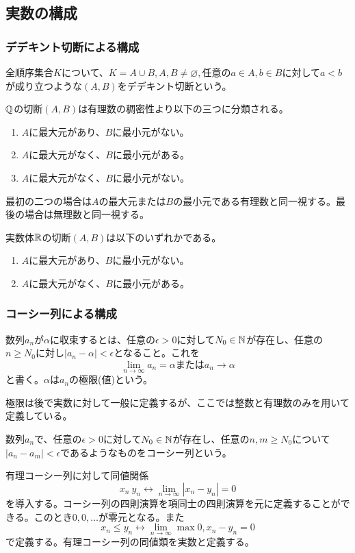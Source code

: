 \subsection{実数の構成}
	\subsubsection{デデキント切断による構成}
		\begin{dfn}[デデキント切断]
			全順序集合$K$について、$K = A \cup B, A, B \neq \varnothing, $任意の$a \in A, b \in B$に対して$a < b$が成り立つような$(A, B)$をデデキント切断という。
		\end{dfn}
		$\mathbb{Q}$の切断$(A, B)$は有理数の稠密性より以下の三つに分類される。
		\begin{enumerate}
			\item $A$に最大元があり、$B$に最小元がない。
			\item $A$に最大元がなく、$B$に最小元がある。
			\item $A$に最大元がなく、$B$に最小元がない。
		\end{enumerate}
		最初の二つの場合は$A$の最大元または$B$の最小元である有理数と同一視する。最後の場合は無理数と同一視する。
		\begin{axm}[デデキントの公理]
			実数体$\mathbb{R}$の切断$(A, B)$は以下のいずれかである。
			\begin{enumerate}
				\item $A$に最大元があり、$B$に最小元がない。
				\item $A$に最大元がなく、$B$に最小元がある。
			\end{enumerate}
		\end{axm}

	\subsubsection{コーシー列による構成}
		\begin{dfn}[極限,$\epsilon-N$論法]
			数列${a_n}$が$\alpha$に収束するとは、任意の$\epsilon > 0$に対して$N_0 \in \mathbb{N}$が存在し、任意の$n \geq N_0$に対し$|a_n - \alpha| < \epsilon$となること。これを
				\[\lim_{n \to \infty} a_n = \alpha または a_n \to \alpha\]
			と書く。$\alpha$は${a_n}$の極限(値)という。
		\end{dfn}
		極限は後で実数に対して一般に定義するが、ここでは整数と有理数のみを用いて定義している。
		\begin{dfn}[コーシー列]
			数列${a_n}$で、任意の$\epsilon > 0$に対して$N_0 \in \mathbb{N}$が存在し、任意の$n, m \geq N_0$について$|a_n - a_m| < \epsilon$であるようなものをコーシー列という。
		\end{dfn}
		有理コーシー列に対して同値関係
			\[{x_n} ~ {y_n} \leftrightarrow \lim_{n \to \infty} |x_n - y_n| = 0\]
		を導入する。コーシー列の四則演算を項同士の四則演算を元に定義することができる。このとき$0, 0, \ldots$が零元となる。また
			\[{x_n} \leq {y_n} \leftrightarrow \lim_{n \to \infty} \max{0, x_n - y_n} = 0\]
		で定義する。有理コーシー列の同値類を実数と定義する。

